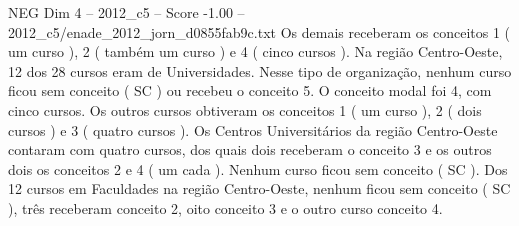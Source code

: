 \begin{textsample}{NEG Dim 4 – 2012\_c5 – Score -1.00 – 2012\_c5/enade\_2012\_jorn\_d0855fab9c.txt}
Os demais receberam os conceitos 1 ( um curso ), 2 ( também um curso ) e 4 ( cinco cursos ).
Na região Centro-Oeste, 12 dos 28 cursos eram de Universidades.
Nesse tipo de organização, nenhum curso ficou sem conceito ( SC ) ou recebeu o conceito 5.
O conceito modal foi 4, com cinco cursos.
Os outros cursos obtiveram os conceitos 1 ( um curso ), 2 ( dois cursos ) e 3 ( quatro cursos ).
Os Centros Universitários da região Centro-Oeste contaram com quatro cursos, dos quais dois receberam o conceito 3 e os outros dois os conceitos 2 e 4 ( um cada ).
Nenhum curso ficou sem conceito ( SC ).
Dos 12 cursos em Faculdades na região Centro-Oeste, nenhum ficou sem conceito ( SC ), três receberam conceito 2, oito conceito 3 e o outro curso conceito 4.

\end{textsample}
